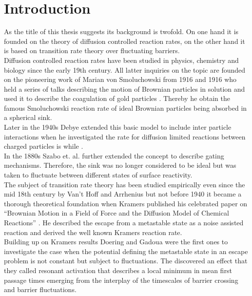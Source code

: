 \setcounter{page}{1}
\chapter{Introduction}

As the title of this thesis suggests its background is twofold. On one hand it is founded on the theory of diffusion controlled reaction rates, on the other hand it is based on transition rate theory over fluctuating barriers. \\

Diffusion controlled reaction rates have been studied in physics, chemistry and biology since the early 19th century. All latter inquiries on the topic are founded on the pioneering work of Marian von Smoluchowski from 1916 and 1916 who held a series of talks \cite{Smoluchowski1916} describing the motion of Brownian particles in solution and used it to describe the coagulation of gold particles \cite{Smoluchowski1917a}. Thereby he obtain the famous Smoluchowski reaction rate of ideal Brownian particles being absorbed in a spherical sink.\\
Later in the 1940s Debye \cite{Debye1942} extended this basic model to include inter particle interactions when he investigated the rate for diffusion limited reactions between charged particles is while . \\
In the 1880s Szabo et. al. \cite{Szabo1982} further extended the concept to describe gating mechanisms. Therefore, the sink was no longer considered to be ideal but was taken to fluctuate between different states of surface reactivity. \\

The subject of transition rate theory has been studied empirically even since the mid 18th century by Van't Hoff \cite{hoff1884} and Arrhenius \cite{arrhenius1889} but not before 1940 it became a thorough theoretical foundation when Kramers published his celebrated paper on ``Brownian Motion in a Field of Force and the Diffusion Model of Chemical Reactions'' \cite{Kramers1940}.
He described the escape from a metastable state as a noise assisted reaction and derived the well known Kramers reaction rate.\\
Building up on Kramers results Doering and Gadoua \cite{Doering1992} were the first ones to investigate the case when the potential defining the metastable state in an escape problem is not constant but subject to fluctuations. The discovered an effect that they called resonant activation that describes a local minimum in mean first passage times emerging from the interplay of the timescales of barrier crossing and barrier fluctuations. \\

